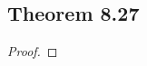 \documentclass[../../main.tex]{subfiles}
\begin{document}
\subsection{Theorem 8.27}
\begin{wts}

\end{wts}
\begin{proof}

\end{proof}
\end{document}
